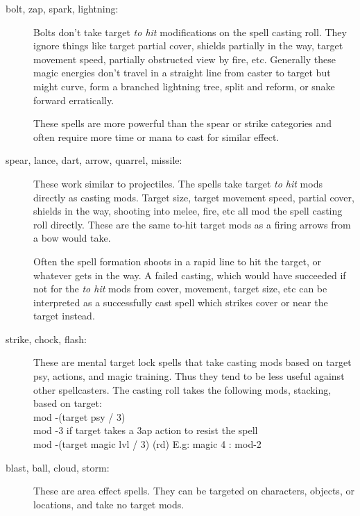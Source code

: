 \begin{description}

\item[bolt, zap, spark, lightning:]
Bolts don't take target \emph{to hit} modifications on the spell casting roll. They ignore things like target partial cover, shields partially in the way, target movement speed, partially obstructed view by fire, etc.
Generally these magic energies don't travel in a straight line from caster to target but might curve, form a branched lightning tree, split and reform, or snake forward erratically.

These spells are more powerful than the spear or strike categories and often require more time or mana to cast for similar effect.


\item[spear, lance, dart, arrow, quarrel, missile:]
These work similar to projectiles. The spells take target \emph{to hit} mods directly as casting mods. Target size, target movement speed, partial cover, shields in the way, shooting into melee, fire, etc all mod the spell casting roll directly. These are the same to-hit target mods as a firing arrows from a bow would take. 


Often the spell formation shoots in a rapid line to hit the target, or whatever gets in the way. A failed casting, which would have succeeded if not for the \emph{to hit} mods from cover, movement, target size, etc can be interpreted as a successfully cast spell which strikes cover or near the target instead.



\item[strike, chock, flash:] 
These are mental target lock spells that take casting mods based on target psy, actions, and magic training. Thus they tend to be less useful against other spellcasters. The casting roll takes the following mods, stacking, based on target:\\
mod -(target psy / 3)\\
mod -3 if target takes a 3ap action to resist the spell\\
mod -(target magic lvl / 3) (rd) E.g: magic 4 : mod-2


\item[blast, ball, cloud, storm:]
These are area effect spells. They can be targeted on characters, objects, or locations, and take no target mods.


\end{description}

